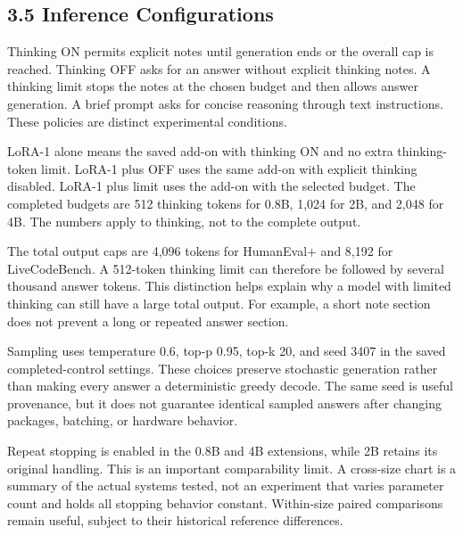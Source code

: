 \documentclass[11pt,letterpaper]{article}
\begin{document}
\subsection*{3.5 Inference Configurations}

Thinking ON permits explicit notes until generation ends or the overall cap is reached. Thinking OFF asks for an answer without explicit thinking notes. A thinking limit stops the notes at the chosen budget and then allows answer generation. A brief prompt asks for concise reasoning through text instructions. These policies are distinct experimental conditions.\par

LoRA-1 alone means the saved add-on with thinking ON and no extra thinking-token limit. LoRA-1 plus OFF uses the same add-on with explicit thinking disabled. LoRA-1 plus limit uses the add-on with the selected budget. The completed budgets are 512 thinking tokens for 0.8B, 1,024 for 2B, and 2,048 for 4B. The numbers apply to thinking, not to the complete output.\par

The total output caps are 4,096 tokens for HumanEval+ and 8,192 for LiveCodeBench. A 512-token thinking limit can therefore be followed by several thousand answer tokens. This distinction helps explain why a model with limited thinking can still have a large total output. For example, a short note section does not prevent a long or repeated answer section.\par

Sampling uses temperature 0.6, top-p 0.95, top-k 20, and seed 3407 in the saved completed-control settings. These choices preserve stochastic generation rather than making every answer a deterministic greedy decode. The same seed is useful provenance, but it does not guarantee identical sampled answers after changing packages, batching, or hardware behavior.\par

Repeat stopping is enabled in the 0.8B and 4B extensions, while 2B retains its original handling. This is an important comparability limit. A cross-size chart is a summary of the actual systems tested, not an experiment that varies parameter count and holds all stopping behavior constant. Within-size paired comparisons remain useful, subject to their historical reference differences.\par
\end{document}

